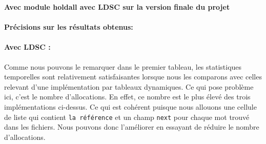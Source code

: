 \documentclass{article}
\begin{document}
\textbf{Avec module holdall avec LDSC sur la version finale du projet}
\begin{center}
\end{center}
\paragraph{\textbf{Précisions sur les résultats obtenus:}}

\paragraph{Avec LDSC :} Comme nous pouvons le remarquer dans le premier tableau, les statistiques temporelles sont relativement satisfaisantes 
lorsque nous les comparons avec celles relevant d'une implémentation par tableaux dynamiques. Ce qui pose problème ici, c'est le nombre d'allocations.
En effet, ce nombre est le plus élevé des trois implémentations ci-dessus. Ce qui est cohérent puisque nous allouons une cellule de liste qui contient
\texttt{la référence} et un champ \texttt{next} pour chaque mot trouvé dans les fichiers.
Nous pouvons donc l'améliorer en essayant de réduire le nombre d'allocations.
\end{document}
